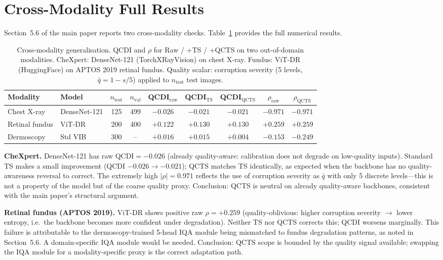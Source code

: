 \documentclass{bmvc2k}
\newcommand{\qbar}{\bar{q}}
\begin{document}
\section{Cross-Modality Full Results}
\label{app:crossdomain}

Section~5.6 of the main paper reports two cross-modality checks. Table~\ref{tab:crossdomain} provides the full numerical results.

\begin{table}[h]
\centering
\caption{Cross-modality generalisation. QCDI and $\rho$ for Raw / +TS / +QCTS on two out-of-domain modalities. CheXpert: DenseNet-121 (TorchXRayVision) on chest X-ray. Fundus: ViT-DR (HuggingFace) on APTOS 2019 retinal fundus. Quality scalar: corruption severity (5 levels, $\qbar = 1 - s/5$) applied to $n_\text{test}$ test images.}
\label{tab:crossdomain}
\footnotesize
\begin{tabular}{llccccccc}
\toprule
Modality & Model & $n_\text{test}$ & $n_\text{val}$ & QCDI$_\text{raw}$ & QCDI$_\text{TS}$ & QCDI$_\text{QCTS}$ & $\rho_\text{raw}$ & $\rho_\text{QCTS}$ \\
\midrule
Chest X-ray  & DenseNet-121 & 125 & 499 & $-0.026$ & $-0.021$ & $-0.021$ & $-0.971$ & $-0.971$ \\
Retinal fundus & ViT-DR & 200 & 400 & $+0.122$ & $+0.130$ & $+0.130$ & $+0.259$ & $+0.259$ \\
\midrule
Dermoscopy & Std VIB & 300 & -- & $+0.016$ & $+0.015$ & $+0.004$ & $-0.153$ & $-0.249$ \\
\bottomrule
\end{tabular}
\end{table}

\textbf{CheXpert.}
DenseNet-121 has raw QCDI${=}{-}0.026$ (already quality-aware: calibration does not degrade on low-quality inputs). Standard TS makes a small improvement (QCDI ${-}0.026{\to}{-}0.021$); QCTS matches TS identically, as expected when the backbone has no quality-awareness reversal to correct. The extremely high $|\rho|{=}0.971$ reflects the use of corruption severity as $\qbar$ with only 5 discrete levels---this is not a property of the model but of the coarse quality proxy. Conclusion: QCTS is neutral on already quality-aware backbones, consistent with the main paper's structural argument.

\textbf{Retinal fundus (APTOS 2019).}
ViT-DR shows positive raw $\rho{=}{+}0.259$ (quality-oblivious: higher corruption severity $\to$ lower entropy, i.e.\ the backbone becomes more confident under degradation). Neither TS nor QCTS corrects this; QCDI worsens marginally. This failure is attributable to the dermoscopy-trained 5-head IQA module being mismatched to fundus degradation patterns, as noted in Section~5.6. A domain-specific IQA module would be needed. Conclusion: QCTS scope is bounded by the quality signal available; swapping the IQA module for a modality-specific proxy is the correct adaptation path.
\end{document}

